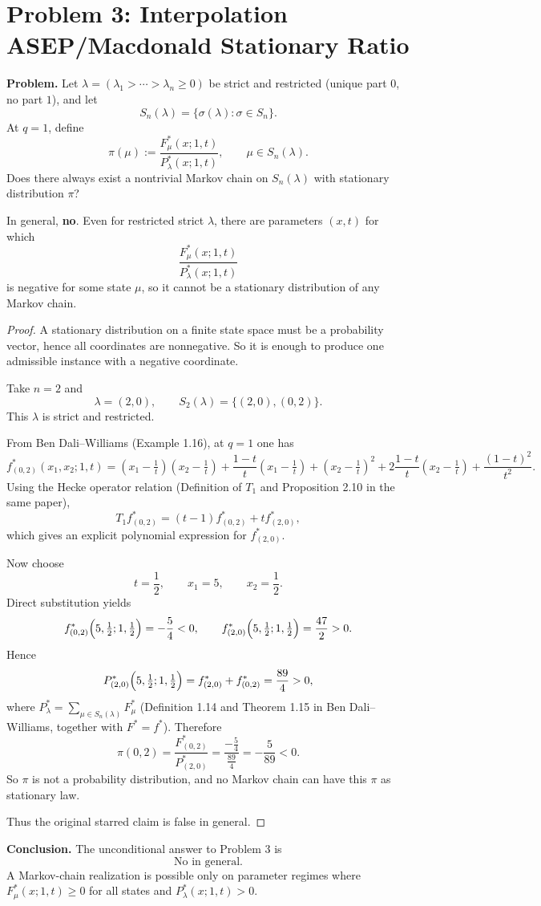 \section{Problem 3: Interpolation ASEP/Macdonald Stationary Ratio}

\textbf{Problem.}
Let $\lambda=(\lambda_1>\cdots>\lambda_n\ge 0)$ be strict and restricted (unique part $0$, no part $1$), and let
\[
S_n(\lambda)=\{\sigma(\lambda):\sigma\in S_n\}.
\]
At $q=1$, define
\[
\pi(\mu):=\frac{F^*_\mu(x;1,t)}{P^*_\lambda(x;1,t)},\qquad \mu\in S_n(\lambda).
\]
Does there always exist a nontrivial Markov chain on $S_n(\lambda)$ with stationary distribution $\pi$?

\begin{theorem}
In general, \textbf{no}. Even for restricted strict $\lambda$, there are parameters $(x,t)$ for which
\[
\frac{F^*_\mu(x;1,t)}{P^*_\lambda(x;1,t)}
\]
is negative for some state $\mu$, so it cannot be a stationary distribution of any Markov chain.
\end{theorem}

\begin{proof}
A stationary distribution on a finite state space must be a probability vector, hence all coordinates are nonnegative.
So it is enough to produce one admissible instance with a negative coordinate.

Take $n=2$ and
\[
\lambda=(2,0),\qquad S_2(\lambda)=\{(2,0),(0,2)\}.
\]
This $\lambda$ is strict and restricted.

From Ben Dali--Williams (Example 1.16), at $q=1$ one has
\[
f^*_{(0,2)}(x_1,x_2;1,t)
=(x_1-\tfrac1t)(x_2-\tfrac1t)
+\frac{1-t}{t}(x_1-\tfrac1t)
+(x_2-\tfrac1t)^2
+2\frac{1-t}{t}(x_2-\tfrac1t)
+\frac{(1-t)^2}{t^2}.
\]
Using the Hecke operator relation (Definition of $T_1$ and Proposition 2.10 in the same paper),
\[
T_1 f^*_{(0,2)}=(t-1)f^*_{(0,2)}+t f^*_{(2,0)},
\]
which gives an explicit polynomial expression for $f^*_{(2,0)}$.

Now choose
\[
t=\frac12,\qquad x_1=5,\qquad x_2=\frac12.
\]
Direct substitution yields
\[
f^*_{(0,2)}\Bigl(5,\tfrac12;1,\tfrac12\Bigr)=-\frac54<0,
\qquad
f^*_{(2,0)}\Bigl(5,\tfrac12;1,\tfrac12\Bigr)=\frac{47}{2}>0.
\]
Hence
\[
P^*_{(2,0)}\Bigl(5,\tfrac12;1,\tfrac12\Bigr)
=f^*_{(2,0)}+f^*_{(0,2)}
=\frac{89}{4}>0,
\]
where $P^*_{\lambda}=\sum_{\mu\in S_n(\lambda)}F^*_\mu$ (Definition 1.14 and Theorem 1.15 in Ben Dali--Williams, together with $F^*=f^*$).
Therefore
\[
\pi(0,2)
=\frac{F^*_{(0,2)}}{P^*_{(2,0)}}
=\frac{-\frac54}{\frac{89}{4}}
=-\frac{5}{89}<0.
\]
So $\pi$ is not a probability distribution, and no Markov chain can have this $\pi$ as stationary law.

Thus the original starred claim is false in general.
\end{proof}

\textbf{Conclusion.}
The unconditional answer to Problem 3 is
\[
\boxed{\text{No in general.}}
\]
A Markov-chain realization is possible only on parameter regimes where
$F^*_\mu(x;1,t)\ge 0$ for all states and $P^*_{\lambda}(x;1,t)>0$.
